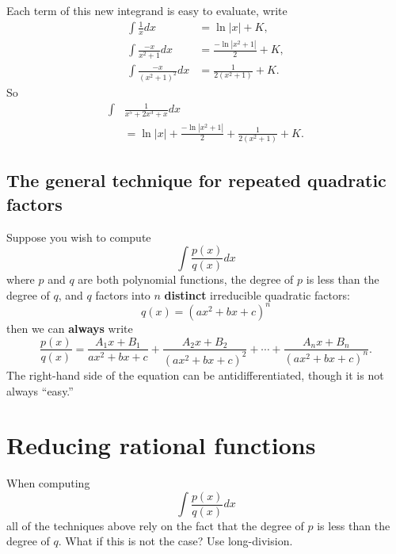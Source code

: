 \documentclass{ximera}
\begin{document}
\begin{example}
\begin{explanation}
\[    \]
    Each term of this new integrand is easy to evaluate, write
    \begin{align*}
      \int \frac{1}{x} dx &= \ln|x| + K,\\
      \int \frac{-x}{x^2+1} dx &= \frac{-\ln|x^2+1|}{2} +K,\\
      \int \frac{-x}{(x^2+1)^2} dx &= \frac{1}{2(x^2+1)}+K.
    \end{align*}
    So
    \begin{align*}
    \int &\frac{1}{x^5 + 2x^3  + x}dx \\
    &=\ln|x| + \frac{-\ln|x^2+1|}{2} + \frac{1}{2(x^2+1)}+K.
    \end{align*}
  \end{explanation}
\end{example}



\subsection{The general technique for repeated quadratic factors}
Suppose you wish to compute
\[
\int \frac{p(x)}{q(x)} dx
\]
where $p$ and $q$ are both polynomial functions, the degree of $p$ is
less than the degree of $q$, and $q$ factors into $n$
\textbf{distinct} irreducible quadratic factors:
\[
q(x) = (ax^2 + b x + c)^n 
\]
then we can \textbf{always} write
\[
\frac{p(x)}{q(x)}  = \frac{A_1x+B_1}{ax^2 + bx + c} + \frac{A_2x+B_2}{(ax^2 + bx + c)^2} + \cdots + \frac{A_nx+B_n}{(ax^2 + b x + c)^n}. 
\]
The right-hand side of the equation can be antidifferentiated, though it is not always ``easy.''


\section{Reducing rational functions}

When computing
\[
\int \frac{p(x)}{q(x)} dx
\]
all of the techniques above rely on the fact that the degree of $p$ is
less than the degree of $q$. What if this is not the case? Use
long-division.
\end{document}
